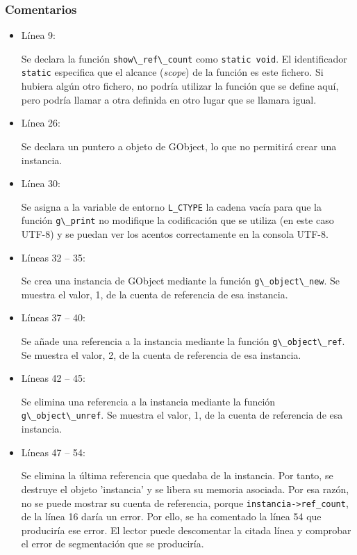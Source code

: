 \subsubsection{Comentarios}
\begin{itemize}
\item Línea 9:\par
  Se declara la función \passthrough{\lstinline!show\_ref\_count!} como \texttt{static void}.
  El identificador \texttt{static} especifica que el alcance (\textit{scope}) de la función es
  este fichero. Si hubiera algún otro fichero, no podría utilizar la función que se define aquí,
  pero podría llamar a otra definida en otro lugar que se llamara igual.
\item Línea 26:\par
  Se declara un puntero a objeto de \textsf{GObject}, lo que no permitirá crear una instancia.
\item Línea 30:\par
  Se asigna a la variable de entorno \texttt{L\_CTYPE} la cadena vacía para que la función
  \passthrough{\lstinline!g\_print!} no modifique la codificación que se utiliza (en este caso UTF-8)
  y se puedan ver los acentos correctamente en la consola UTF-8.
\item Líneas 32 -- 35:\par
  Se crea una instancia de \textsf{GObject} mediante la función \passthrough{\lstinline!g\_object\_new!}.
  Se muestra el valor, 1,  de la cuenta de referencia de esa instancia.
\item Líneas 37 -- 40:\par
  Se añade una referencia a la instancia mediante la función  \passthrough{\lstinline!g\_object\_ref!}.
  Se muestra el valor, 2,  de la cuenta de referencia de esa instancia.
\item Líneas 42 -- 45:\par
  Se elimina una referencia a la instancia mediante la función  \passthrough{\lstinline!g\_object\_unref!}.
  Se muestra el valor, 1,  de la cuenta de referencia de esa instancia.
\item Líneas 47 -- 54:\par
  Se elimina la  última referencia que quedaba de la instancia.
  Por tanto, se destruye el objeto 'instancia' y se libera su memoria asociada.
  Por esa razón, no se puede mostrar su cuenta de referencia, porque
  \passthrough{\lstinline!instancia->ref_count!}, de la línea 16 daría un error.
  Por ello, se ha comentado la línea 54 que produciría ese error.
  El lector puede descomentar la citada línea y comprobar el error de segmentación que se produciría.
  \end{itemize}



